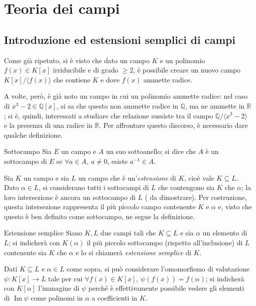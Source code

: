 \documentclass[11pt, a4paper]{scrartcl}
\theoremstyle{definition}
\numberwithin{esempio}{section}
\theoremstyle{definition}
\numberwithin{obs}{section}
\numberwithin{nota}{section}
\numberwithin{equation}{subsection}
\begin{document}
\section{Teoria dei campi}
\subsection{Introduzione ed estensioni semplici di campi}
Come gi\`a ripetuto, si \`e visto che dato un campo $K$ e un polinomio $f(x) \in K[x]$ irriducibile e di grado $\ge 2$, \`e possibile creare un nuovo campo $K[x] / \langle f(x) \rangle$ che contiene $K$ e dove $f(x)$ ammette radice.

A volte, per\`o, \`e gi\`a noto un campo in cui un polinomio ammette radice: nel caso di $x^3 - 2 \in \mathbb{Q}[x]$, si sa che questo non ammette radice in $\mathbb{Q}$, ma ne ammette in $\mathbb{R}$; si \`e, quindi, interessati a studiare che relazione sussiste tra il campo $\mathbb{Q} / \langle x^3 - 2 \rangle$ e la presenza di una radice in $\mathbb{R}$.
Per affrontare questo discorso, \`e necessario dare qualche definizione.
\begin{definizione}
	{Sottocampo}{}
	Sia $E$ un campo e $A$ un suo sottoanello; si dice che $A$ \`e un sottocampo di $E$ se $\forall a \in A, \ a \neq 0$, esiste $a^{-1} \in A$.
\end{definizione}
\noindent Sia $K$ un campo e sia $L$ un campo che \`e un'\textit{estensione} di $K$, cio\`e vale $K \subseteq L$.
Dato $\alpha  \in L$, si considerano tutti i sottocampi di $L$ che contengono sia $K$ che $\alpha $; la loro intersezione \`e ancora un sottocampo di $L$ ({\color{red} da dimostrare}).
Per costruzione, questa intersezione rappresenta il pi\`u piccolo campo contenente $K$ e $\alpha $ e, visto che questo \`e ben definito come sottocampo, ne segue la definizione.

\begin{definizione}
	{Estensione semplice}{}
	Siano $K, L$ due campi tali che $K \subseteq L$ e sia $\alpha $ un elemento di $L$; si indicher\`a con $K(\alpha )$ il pi\`u piccolo sottocampo (rispetto all'inclusione) di $L$ contenente sia $K$ che $\alpha $ e lo si chiamer\`a \textit{estensione semplice} di $K$.
\end{definizione}
\noindent Dati $K \subseteq L$ e $\alpha  \in L$ come sopra, si pu\`o considerare l'omomorfismo di valutazione $\psi  : K[x] \to L $ tale per cui $\forall f(x) \in K[x], \ \psi (f(x)) = f(\alpha )$; si indicher\`a con $K[\alpha ]$ l'immagine di $\psi $ perch\'e \`e effettivamente possibile vedere gli elementi di $\operatorname{Im} \psi  $ come polinomi in $\alpha $ a coefficienti in $K$.
\end{document}

